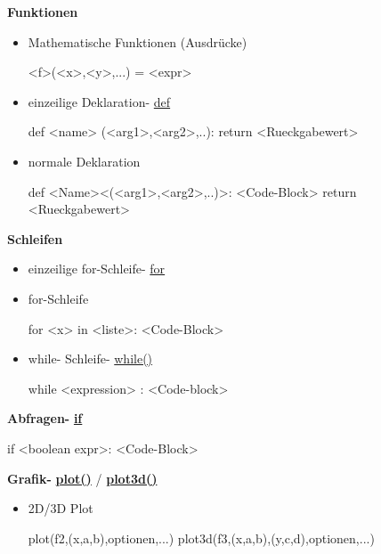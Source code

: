 \documentclass[a4paper,9pt,DIV15,twocolumn]{scrartcl}
\begin{document}
{\textbf{Funktionen}
\begin{itemize}
 \item Mathematische Funktionen (Ausdrücke)
\begin{sagein}
<f>(<x>,<y>,...) = <expr>
\end{sagein}
    \item einzeilige Deklaration- \href{http://docs.python.org/reference/compound_stmts.html#function-definitions}{def}     
        \begin{sagein}
def <name> (<arg1>,<arg2>,..): return <Rueckgabewert>            
        \end{sagein}
 \item normale Deklaration
\begin{sagein}
def <Name><(<arg1>,<arg2>,..)>:
    <Code-Block>
    return <Rueckgabewert>
\end{sagein}
\end{itemize}

\textbf{Schleifen}
\begin{itemize}
\item einzeilige for-Schleife- \href{http://docs.python.org/tutorial/controlflow.html#for-statements}{for}
    \begin{sagein}
    \end{sagein}
\item for-Schleife
    \begin{sagein}
for <x> in <liste>:
    <Code-Block>
    \end{sagein}
  \item while- Schleife- \href{http://docs.python.org/reference/compound_stmts.html#the-while-statement}{while()}
\begin{sagein}
while <expression> :
    <Code-block>
\end{sagein}
\end{itemize}
\textbf{Abfragen- }\href{http://docs.python.org/reference/compound_stmts.html#the-if-statement}{\textbf{if}}
\begin{sagein}
if <boolean expr>:
    <Code-Block>
\end{sagein}

\textbf{Grafik- }\href{https://sage.math.uni-goettingen.de/doc/static/reference/sage/combinat/e_one_star.html?highlight=.plot#sage.combinat.e_one_star.Patch.plot}{\textbf{plot()}}	/	\href{https://sage.math.uni-goettingen.de/doc/static/reference/sage/combinat/e_one_star.html?highlight=.plot#sage.combinat.e_one_star.Patch.plot3d}{\textbf{plot3d()}}
\begin{itemize}
\item 2D/3D Plot
\begin{sagein}
plot(f2,(x,a,b),optionen,...)
plot3d(f3,(x,a,b),(y,c,d),optionen,...)
\end{sagein}
\end{itemize}

}
\end{document}
